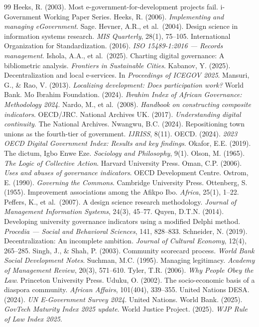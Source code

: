 \documentclass[sigconf,anonymous]{acmart}
\begin{document}
\begin{thebibliography}{99}
 Heeks, R. (2003). Most e-government-for-development projects fail. i-Government Working Paper Series.
 Heeks, R. (2006). \textit{Implementing and managing eGovernment}. Sage.
 Hevner, A.R., et al.\ (2004). Design science in information systems research. \textit{MIS Quarterly}, 28(1), 75--105.
 International Organization for Standardization. (2016). \textit{ISO 15489-1:2016 --- Records management}.
 Ishola, A.A., et al.\ (2025). Charting digital governance: A bibliometric analysis. \textit{Frontiers in Sustainable Cities}.
 Kabanov, Y. (2025). Decentralization and local e-services. In \textit{Proceedings of ICEGOV 2025}.
 Mansuri, G., \& Rao, V. (2013). \textit{Localizing development: Does participation work?} World Bank.
 Mo Ibrahim Foundation. (2024). \textit{Ibrahim Index of African Governance: Methodology 2024}.
 Nardo, M., et al.\ (2008). \textit{Handbook on constructing composite indicators}. OECD/JRC.
 National Archives UK. (2017). \textit{Understanding digital continuity}. The National Archives.
 Nwangwu, B.C. (2024). Repositioning town unions as the fourth-tier of government. \textit{IJRISS}, 8(11).
 OECD. (2024). \textit{2023 OECD Digital Government Index: Results and key findings}.
 Okafor, E.E. (2019). The dictum, Igbo Enwe Eze. \textit{Sociology and Philosophy}, 9(1).
 Olson, M. (1965). \textit{The Logic of Collective Action}. Harvard University Press.
 Oman, C.P. (2006). \textit{Uses and abuses of governance indicators}. OECD Development Centre.
 Ostrom, E. (1990). \textit{Governing the Commons}. Cambridge University Press.
 Ottenberg, S. (1955). Improvement associations among the Afikpo Ibo. \textit{Africa}, 25(1), 1--22.
 Peffers, K., et al.\ (2007). A design science research methodology. \textit{Journal of Management Information Systems}, 24(3), 45--77.
 Quyen, D.T.N. (2014). Developing university governance indicators using a modified Delphi method. \textit{Procedia --- Social and Behavioral Sciences}, 141, 828--833.
 Schneider, N. (2019). Decentralization: An incomplete ambition. \textit{Journal of Cultural Economy}, 12(4), 265--285.
 Singh, J., \& Shah, P. (2003). Community scorecard process. \textit{World Bank Social Development Notes}.
 Suchman, M.C. (1995). Managing legitimacy. \textit{Academy of Management Review}, 20(3), 571--610.
 Tyler, T.R. (2006). \textit{Why People Obey the Law}. Princeton University Press.
 Uduku, O. (2002). The socio-economic basis of a diaspora community. \textit{African Affairs}, 101(404), 339--355.
 United Nations DESA. (2024). \textit{UN E-Government Survey 2024}. United Nations.
 World Bank. (2025). \textit{GovTech Maturity Index 2025 update}.
 World Justice Project. (2025). \textit{WJP Rule of Law Index 2025}.

\end{thebibliography}
\end{document}
